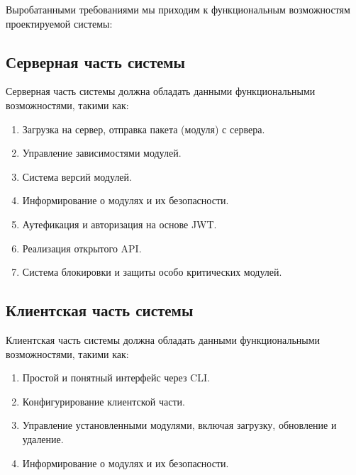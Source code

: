 Выробатанными требованиями мы приходим к функциональным возможностям проектируемой системы:

\subsection{Серверная часть системы}

Серверная часть системы должна обладать данными функциональными возможностями, такими как:

\begin{enumerate}
    \item Загрузка на сервер, отправка пакета (модуля) с сервера.
    \item Управление зависимостями модулей.
    \item Система версий модулей.
    \item Информирование о модулях и их безопасности.
    \item Аутефикация и авторизация на основе JWT.
    \item Реализация открытого API.
    \item Система блокировки и защиты особо критических модулей.
\end{enumerate}



\subsection{Клиентская часть системы}

Клиентская часть системы должна обладать данными функциональными возможностями, такими как:

\begin{enumerate}
    \item Простой и понятный интерфейс через CLI.
    \item Конфигурирование клиентской части.
    \item Управление установленными модулями, включая загрузку, обновление и удаление.
    \item Информирование о модулях и их безопасности.
\end{enumerate}

